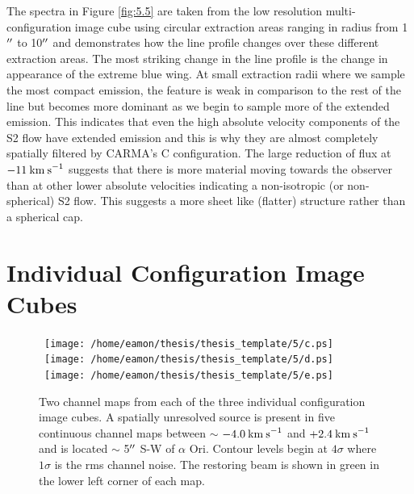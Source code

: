 The spectra in Figure \ref{fig:5.5} are taken from the low resolution multi-configuration image cube using circular extraction areas ranging in radius from 1$^{\prime\prime}$ to 10$^{\prime\prime}$ and demonstrates how the line profile changes over these different extraction areas. The most striking change in the line profile is the change in appearance of the extreme blue wing. At small extraction radii where we sample the most compact emission, the feature is weak in comparison to the rest of the line but becomes more dominant as we begin to sample more of the extended emission. This indicates that even the high absolute velocity components of the S2 flow have extended emission and this is why they are almost completely spatially filtered by CARMA's C configuration. The large reduction of flux at $-11\>{\rm km\>s}^{-1}$ suggests that there is more material moving towards the observer than at other lower absolute velocities indicating a non-isotropic (or non-spherical) S2 flow. This suggests a more sheet like (flatter) structure rather than a spherical cap.

\section{Individual Configuration Image Cubes}\label{sec:5.4}

\begin{figure}[htp]
\mbox{
          \texttt{[image: /home/eamon/thesis/thesis\_template/5/c.ps]}
          }
\mbox{
          \texttt{[image: /home/eamon/thesis/thesis\_template/5/d.ps]}
          }
\mbox{
          \texttt{[image: /home/eamon/thesis/thesis\_template/5/e.ps]}
          }          
\caption[Discrete sources in individual configuration image cubes]{Two channel maps from each of the three individual configuration image cubes. A spatially unresolved source is present in five continuous channel maps between $\sim$ $-4.0\>{\rm km\>s}^{-1}$ and $+2.4\>{\rm km\>s}^{-1}$ and is located $\sim$ 5$^{\prime\prime}$ S-W of $\alpha$ Ori. Contour levels begin at $4\sigma$ where $1\sigma$ is the rms channel noise. The restoring beam is shown in green in the lower left corner of each map.}
\label{fig:5.6}
\end{figure}

